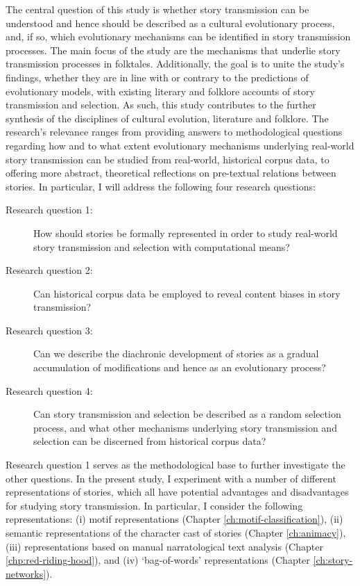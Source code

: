 The central question of this study is whether story transmission can be understood and hence should be described as a cultural evolutionary process, and, if so, which evolutionary mechanisms can be identified in story transmission processes. The main focus of the study are the mechanisms that underlie story transmission processes in folktales. Additionally, the goal is to unite the study's findings, whether they are in line with or contrary to the predictions of evolutionary models, with existing literary and folklore accounts of story transmission and selection. As such, this study contributes to the further synthesis of the disciplines of cultural evolution, literature and folklore. The research's relevance ranges from providing answers to methodological questions regarding how and to what extent evolutionary mechanisms underlying real-world story transmission can be studied from real-world, historical corpus data, to offering more abstract, theoretical reflections on pre-textual relations between stories. In particular, I will address the following four research questions:
\begin{description}
\item[Research question 1:] How should stories be formally represented in order to study real-world story transmission and selection with computational means?
\item[Research question 2:] Can historical corpus data be employed to reveal content biases in story transmission?
\item[Research question 3:] Can we describe the diachronic development of stories as a gradual accumulation of modifications and hence as an evolutionary process?
\item[Research question 4:] Can story transmission and selection be described as a random selection process, and what other mechanisms underlying story transmission and selection can be discerned from historical corpus data?
\end{description}
Research question 1 serves as the methodological base to further investigate the other questions. In the present study, I experiment with a number of different representations of stories, which all have potential advantages and disadvantages for studying story transmission. In particular, I consider the following representations: (i) motif representations (Chapter \ref{ch:motif-classification}), (ii) semantic representations of the character cast of stories (Chapter \ref{ch:animacy}), (iii) representations based on manual narratological text analysis (Chapter \ref{chp:red-riding-hood}), and (iv) `bag-of-words' representations (Chapter \ref{ch:story-networks}). 

